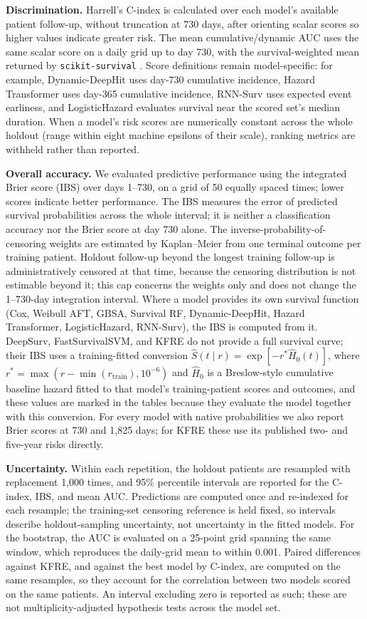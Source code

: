 \textbf{Discrimination.} Harrell's C-index is calculated over each model's available patient follow-up, without truncation at 730 days, after orienting scalar scores so higher values indicate greater risk. The mean cumulative/dynamic AUC uses the same scalar score on a daily grid up to day 730, with the survival-weighted mean returned by \texttt{scikit-survival} \citep{polsterl2020sksurv}. Score definitions remain model-specific: for example, Dynamic-DeepHit uses day-730 cumulative incidence, Hazard Transformer uses day-365 cumulative incidence, RNN-Surv uses expected event earliness, and LogisticHazard evaluates survival near the scored set's median duration. When a model's risk scores are numerically constant across the whole holdout (range within eight machine epsilons of their scale), ranking metrics are withheld rather than reported.

\textbf{Overall accuracy.} We evaluated predictive performance using the integrated Brier score (IBS) over days 1--730, on a grid of 50 equally spaced times; lower scores indicate better performance. The IBS measures the error of predicted survival probabilities across the whole interval; it is neither a classification accuracy nor the Brier score at day 730 alone. The inverse-probability-of-censoring weights are estimated by Kaplan--Meier from one terminal outcome per training patient. Holdout follow-up beyond the longest training follow-up is administratively censored at that time, because the censoring distribution is not estimable beyond it; this cap concerns the weights only and does not change the 1--730-day integration interval. Where a model provides its own survival function (Cox, Weibull AFT, GBSA, Survival RF, Dynamic-DeepHit, Hazard Transformer, LogisticHazard, RNN-Surv), the IBS is computed from it. DeepSurv, FastSurvivalSVM, and KFRE do not provide a full survival curve; their IBS uses a training-fitted conversion $\hat S(t\mid r)=\exp[-r^*\hat H_0(t)]$, where $r^*=\max(r-\min(r_{\mathrm{train}}),10^{-6})$ and $\hat H_0$ is a Breslow-style cumulative baseline hazard fitted to that model's training-patient scores and outcomes, and these values are marked in the tables because they evaluate the model together with this conversion. For every model with native probabilities we also report Brier scores at 730 and 1{,}825 days; for KFRE these use its published two- and five-year risks directly.

\textbf{Uncertainty.} Within each repetition, the holdout patients are resampled with replacement 1{,}000 times, and 95\% percentile intervals are reported for the C-index, IBS, and mean AUC. Predictions are computed once and re-indexed for each resample; the training-set censoring reference is held fixed, so intervals describe holdout-sampling uncertainty, not uncertainty in the fitted models. For the bootstrap, the AUC is evaluated on a 25-point grid spanning the same window, which reproduces the daily-grid mean to within 0.001. Paired differences against KFRE, and against the best model by C-index, are computed on the same resamples, so they account for the correlation between two models scored on the same patients. An interval excluding zero is reported as such; these are not multiplicity-adjusted hypothesis tests across the model set.


